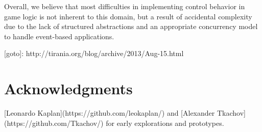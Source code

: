 \documentclass{vgtc}                          %
\begin{document}
Overall, we believe that most difficulties in implementing control behavior in 
game logic is not inherent to this domain, but a result of accidental
complexity due to the lack of structured abstractions and an appropriate
concurrency model to handle event-based applications.

[goto]: http://tirania.org/blog/archive/2013/Aug-15.html

\section{Acknowledgments}

[Leonardo Kaplan](https://github.com/leokaplan/) and
[Alexander Tkachov](https://github.com/Tkachov/)
for early explorations and prototypes.



\end{document}
